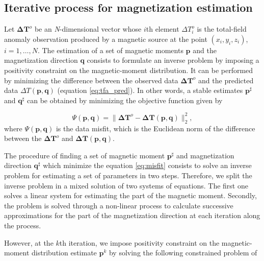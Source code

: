 \subsection{Iterative process for magnetization estimation}

Let $\mathbf{\Delta T}^o$ be an \textit{N}-dimensional vector whose $i$th element $\Delta T_i^o$ is the total-field anomaly observation produced by a magnetic source at the point $(x_i,y_i,z_i)$, $i = 1, \ldots, N$. The estimation of a set of magnetic moments $\mathbf{p}$ and the magnetization direction $\mathbf{q}$ consists to formulate an inverse problem by imposing a positivity constraint on the magnetic-moment distribution. It can be performed by minimizing the difference between the observed data $\mathbf{\Delta T}^o$ and the predicted data $\Delta T (\mathbf{p}, \mathbf{q})$ (equation \ref{eq:tfa_pred}). In other words, a stable estimates $\mathbf{p}^\sharp$ and $\mathbf{q}^\sharp$ can be obtained by minimizing the objective function given by

\begin{equation}
\Psi(\mathbf{p}, \mathbf{q}) =  \parallel \mathbf{\Delta T}^o - \mathbf{\Delta T} (\mathbf{p}, \mathbf{q}) \parallel_{2}^{2},
\label{eq:misfit}
\end{equation}
where $\Psi(\mathbf{p}, \mathbf{q})$ is the data misfit, which is the Euclidean norm of the difference between the $\mathbf{\Delta T}^o$ and $\mathbf{\Delta T} (\mathbf{p}, \mathbf{q})$.

The procedure of finding a set of magnetic moment $\mathbf{p}^\sharp$ and magnetization direction $\mathbf{q}^\sharp$ which minimize the equation \ref{eq:misfit} consists to solve an inverse problem for estimating a set of parameters in two steps. Therefore, we split the inverse problem in a mixed solution of two systems of equations. The first one solves a linear system for estimating the part of the magnetic moment. Secondly, the problem is solved through a non-linear process to calculate successive approximations for the part of the magnetization direction at each iteration along the process. 

However, at the $k$th iteration, we impose positivity constraint on the magnetic-moment distribution estimate $\mathbf{p}^k$ by solving the following constrained problem of

